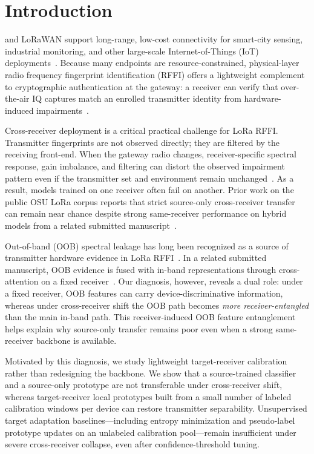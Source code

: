 \section{Introduction}
\label{sec:intro}

 and LoRaWAN support long-range, low-cost connectivity for smart-city sensing, industrial monitoring, and other large-scale Internet-of-Things (IoT) deployments~\cite{hamdaoui2022deeplearning}.
Because many endpoints are resource-constrained, physical-layer radio frequency fingerprint identification (RFFI) offers a lightweight complement to cryptographic authentication at the gateway: a receiver can verify that over-the-air IQ captures match an enrolled transmitter identity from hardware-induced impairments~\cite{brik2008wireless_device_id,jian2020deeplearning_rf_fingerprinting,xie2021physical_layer_auth_survey}.

Cross-receiver deployment is a critical practical challenge for LoRa RFFI.
Transmitter fingerprints are not observed directly; they are filtered by the receiving front-end.
When the gateway radio changes, receiver-specific spectral response, gain imbalance, and filtering can distort the observed impairment pattern even if the transmitter set and environment remain unchanged~\cite{elmaghbub2021lora_wild,ma2025receiver_independent_rffi}.
As a result, models trained on one receiver often fail on another.
Prior work on the public OSU LoRa corpus reports that strict source-only cross-receiver transfer can remain near chance despite strong same-receiver performance on hybrid models from a related submitted manuscript~\cite{paper1_placeholder,elmaghbub2021lora_wild,shen2021lora_jsac}.

Out-of-band (OOB) spectral leakage has long been recognized as a source of transmitter hardware evidence in LoRa RFFI~\cite{elmaghbub2020widescan,shen2021lora_jsac,hamdaoui2022deeplearning}.
In a related submitted manuscript, OOB evidence is fused with in-band representations through cross-attention on a fixed receiver~\cite{paper1_placeholder}.
Our diagnosis, however, reveals a dual role: under a fixed receiver, OOB features can carry device-discriminative information, whereas under cross-receiver shift the OOB path becomes \emph{more receiver-entangled} than the main in-band path.
This receiver-induced OOB feature entanglement helps explain why source-only transfer remains poor even when a strong same-receiver backbone is available.

Motivated by this diagnosis, we study lightweight target-receiver calibration rather than redesigning the backbone.
We show that a source-trained classifier and a source-only prototype are not transferable under cross-receiver shift, whereas target-receiver local prototypes built from a small number of labeled calibration windows per device can restore transmitter separability.
Unsupervised target adaptation baselines---including entropy minimization and pseudo-label prototype updates on an unlabeled calibration pool---remain insufficient under severe cross-receiver collapse, even after confidence-threshold tuning.

